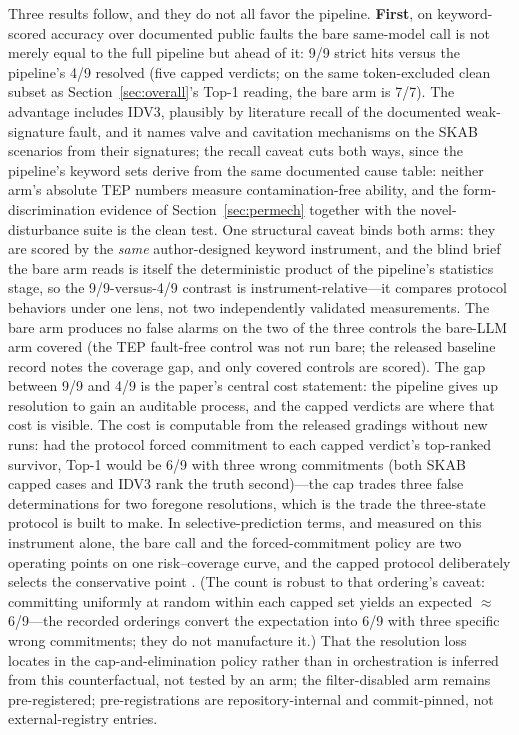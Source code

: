 \documentclass[preprint,12pt]{elsarticle}
\begin{document}
Three results follow, and they do not all favor the pipeline. \textbf{First}, on keyword-scored accuracy over documented public faults the bare same-model call is not merely equal to the full pipeline but ahead of it: 9/9 strict hits versus the pipeline's 4/9 resolved (five capped verdicts; on the same token-excluded clean subset as Section~\ref{sec:overall}'s Top-1 reading, the bare arm is 7/7). The advantage includes IDV3, plausibly by literature recall of the documented weak-signature fault, and it names valve and cavitation mechanisms on the SKAB scenarios from their signatures; the recall caveat cuts both ways, since the pipeline's keyword sets derive from the same documented cause table: neither arm's absolute TEP numbers measure contamination-free ability, and the form-discrimination evidence of Section~\ref{sec:permech} together with the novel-disturbance suite is the clean test. One structural caveat binds both arms: they are scored by the \emph{same} author-designed keyword instrument, and the blind brief the bare arm reads is itself the deterministic product of the pipeline's statistics stage, so the 9/9-versus-4/9 contrast is instrument-relative---it compares protocol behaviors under one lens, not two independently validated measurements. The bare arm produces no false alarms on the two of the three controls the bare-LLM arm covered (the TEP fault-free control was not run bare; the released baseline record notes the coverage gap, and only covered controls are scored). The gap between 9/9 and 4/9 is the paper's central cost statement: the pipeline gives up resolution to gain an auditable process, and the capped verdicts are where that cost is visible. The cost is computable from the released gradings without new runs: had the protocol forced commitment to each capped verdict's top-ranked survivor, Top-1 would be 6/9 with three wrong commitments (both SKAB capped cases and IDV3 rank the truth second)---the cap trades three false determinations for two foregone resolutions, which is the trade the three-state protocol is built to make. In selective-prediction terms, and measured on this instrument alone, the bare call and the forced-commitment policy are two operating points on one risk--coverage curve, and the capped protocol deliberately selects the conservative point \cite{chow1970optimum,angelopoulos2023conformal}. (The count is robust to that ordering's caveat: committing uniformly at random within each capped set yields an expected $\approx$6/9---the recorded orderings convert the expectation into 6/9 with three specific wrong commitments; they do not manufacture it.) That the resolution loss locates in the cap-and-elimination policy rather than in orchestration is inferred from this counterfactual, not tested by an arm; the filter-disabled arm remains pre-registered; pre-registrations are repository-internal and commit-pinned, not external-registry entries.
\end{document}
